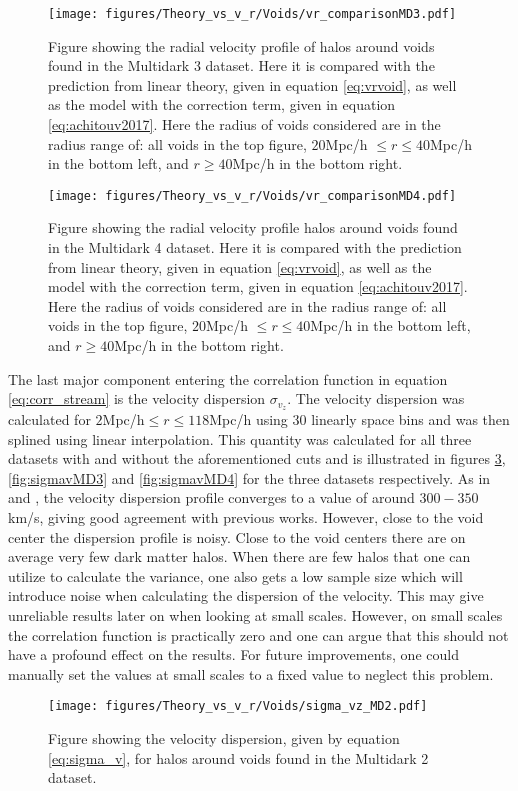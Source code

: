 \begin{figure}[H]
    \texttt{[image: figures/Theory\_vs\_v\_r/Voids/vr\_comparisonMD3.pdf]}
    \caption{Figure showing the radial velocity profile of halos around voids found in the Multidark 3 dataset. Here it is compared with the prediction from linear theory, given in equation \ref{eq:vrvoid}, as well as the model with the correction term, given in equation \ref{eq:achitouv2017}. Here the radius of voids considered are in the radius range of: all voids in the top figure, $20$Mpc/h $\leq r\leq 40$Mpc/h in the bottom left, and $r\geq 40$Mpc/h in the bottom right.}
    \label{fig:vrMD3}
\end{figure}

\begin{figure}[H]
    \texttt{[image: figures/Theory\_vs\_v\_r/Voids/vr\_comparisonMD4.pdf]}
    \caption{Figure showing the radial velocity profile halos around voids found in the Multidark 4 dataset. Here it is compared with the prediction from linear theory, given in equation \ref{eq:vrvoid}, as well as the model with the correction term, given in equation \ref{eq:achitouv2017}. Here the radius of voids considered are in the radius range of: all voids in the top figure, $20$Mpc/h $\leq r\leq 40$Mpc/h in the bottom left, and $r\geq 40$Mpc/h in the bottom right.}
    \label{fig:vrMD4}
\end{figure}
The last major component entering the correlation function in equation \ref{eq:corr_stream} is the velocity dispersion $\sigma_{v_z}$. The velocity dispersion was calculated for $2$Mpc/h$\leq r\leq 118$Mpc/h using $30$ linearly space bins and was then splined using linear interpolation. This quantity was calculated for all three datasets with and without the aforementioned cuts and is illustrated in figures \ref{fig:sigmavMD2}, \ref{fig:sigmavMD3} and \ref{fig:sigmavMD4} for the three datasets respectively. As in \cite{Nadathur_corr} and \cite{Achitouv_streaming}, the velocity dispersion profile converges to a value of around $300-350$ km/s, giving good agreement with previous works. However, close to the void center the dispersion profile is noisy. Close to the void centers there are on average very few dark matter halos. When there are few halos that one can utilize to calculate the variance, one also gets a low sample size which will introduce noise when calculating the dispersion of the velocity. This may give unreliable results later on when looking at small scales. However, on small scales the correlation function is practically zero and one can argue that this should not have a profound effect on the results. For future improvements, one could manually set the values at small scales to a fixed value to neglect this problem.
\begin{figure}[H]
    \texttt{[image: figures/Theory\_vs\_v\_r/Voids/sigma\_vz\_MD2.pdf]}
    \caption{Figure showing the velocity dispersion, given by equation \ref{eq:sigma_v}, for halos around voids found in the Multidark 2 dataset.}
    \label{fig:sigmavMD2}
\end{figure}

